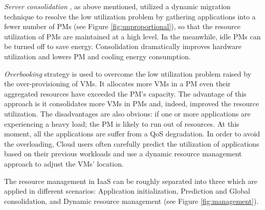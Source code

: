 \emph{Server consolidation} \cite{Zhang:2010vo}, as above mentioned, utilized a dynamic migration technique to resolve the low utilization problem by gathering applications into a fewer number of PMs (see Figure \ref{fig:unproportional}), so that the resource utilization of PMs are maintained at a high level. In the meanwhile, idle PMs can be turned off to save energy. Consolidation dramatically improves hardware utilization and lowers PM and cooling energy consumption. 

\emph{Overbooking} strategy \cite{Tomas:2013iv} is used to overcome the low utilization problem raised by the over-provisioning of VMs. It allocates more VMs in a PM even their aggregated resources have exceeded the PM's capacity. The advantage of this approach is it consolidates more VMs in PMs and, indeed, improved the resource utilization. The disadvantages are also obvious: if one or more applications are experiencing a heavy load; the PM is likely to run out of resources. At this moment, all the applications are suffer from a QoS degradation. In order to avoid the overloading, Cloud users often carefully predict the utilization of applications based on their previous workloads and use a dynamic resource management approach to adjust the VMs' location.

The resource management in IaaS can be roughly separated into three \cite{Svard:2015ic, Mishra:2012kx} which are applied in different scenarios: Application initialization, Prediction and Global consolidation, and Dynamic resource management (see Figure \ref{fig:management}). 


